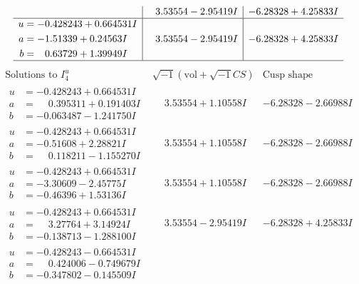 \documentclass[1p]{elsarticle_modified}
\theoremstyle{definition}
\newcommand{\I}{\sqrt{-1}}
\begin{document}
$$\begin{array}{c|c|c}
 & \phantom{-}3.53554 - 2.95419 I & -6.28328 + 4.25833 I \\ \hline\begin{aligned}
u &= -0.428243 + 0.664531 I \\
a &= -1.51339 + 0.24563 I \\
b &= \phantom{-}0.63729 + 1.39949 I\end{aligned}
 & \phantom{-}3.53554 - 2.95419 I & -6.28328 + 4.25833 I\\
 \hline 
 \end{array}$$\newpage$$\begin{array}{c|c|c}  
\text{Solutions to }I^u_{4}& \I (\text{vol} + \sqrt{-1}CS) & \text{Cusp shape}\\
 \hline 
\begin{aligned}
u &= -0.428243 + 0.664531 I \\
a &= \phantom{-}0.395311 + 0.191403 I \\
b &= -0.063487 - 1.241750 I\end{aligned}
 & \phantom{-}3.53554 + 1.10558 I & -6.28328 - 2.66988 I \\ \hline\begin{aligned}
u &= -0.428243 + 0.664531 I \\
a &= -0.51608 + 2.28821 I \\
b &= \phantom{-}0.118211 - 1.155270 I\end{aligned}
 & \phantom{-}3.53554 + 1.10558 I & -6.28328 - 2.66988 I \\ \hline\begin{aligned}
u &= -0.428243 + 0.664531 I \\
a &= -3.30609 - 2.45775 I \\
b &= -0.46396 + 1.53136 I\end{aligned}
 & \phantom{-}3.53554 + 1.10558 I & -6.28328 - 2.66988 I \\ \hline\begin{aligned}
u &= -0.428243 + 0.664531 I \\
a &= \phantom{-}3.27764 + 3.14924 I \\
b &= -0.138713 - 1.288100 I\end{aligned}
 & \phantom{-}3.53554 - 2.95419 I & -6.28328 + 4.25833 I \\ \hline\begin{aligned}
u &= -0.428243 - 0.664531 I \\
a &= \phantom{-}0.424006 - 0.749679 I \\
b &= -0.347802 - 0.145509 I\end{aligned}

\end{array}$$
\end{document}
